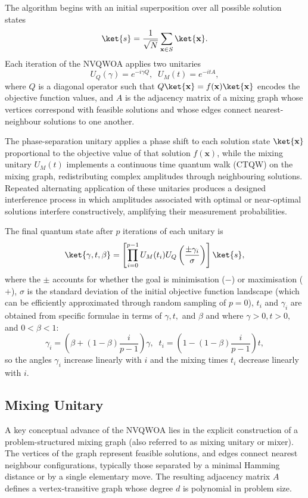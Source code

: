 The algorithm begins with an initial superposition over all possible solution states
$$
\ket{s}=\frac{1}{\sqrt{N}}\sum_{\mathbf{x}\in S}\ket{\mathbf{x}}.
$$
Each iteration of the NVQWOA applies two unitaries
$$
U_Q(\gamma)=e^{-i\gamma Q},\;\;U_M(t)=e^{-itA},
$$
where $Q$ is a diagonal operator such that $Q\ket{\mathbf{x}}=f(\mathbf{x})\ket{\mathbf{x}}$ encodes the objective function values, and $A$ is the adjacency matrix of a mixing graph whose vertices correspond with feasible solutions and whose edges connect nearest-neighbour solutions to one another.

The phase-separation unitary applies a phase shift to each solution state $\ket{\mathbf{x}}$ proportional to the objective value of that solution $f(\mathbf{x})$, while the mixing unitary $U_M(t)$ implements a continuous time quantum walk (CTQW) on the mixing graph, redistributing complex amplitudes through neighbouring solutions. Repeated alternating application of these unitaries produces a designed interference process in which amplitudes associated with optimal or near-optimal solutions interfere constructively, amplifying their measurement probabilities.

The final quantum state after $p$ iterations of each unitary is
$$
\ket{\gamma,t,\beta}=\left[\prod_{i=0}^{p-1} U_M(t_i)U_Q\left(\frac{\pm \gamma_i}{\sigma}\right)\right] \ket{s},
$$
where the $\pm$ accounts for whether the goal is minimisation ($-$) or maximisation ($+$), $\sigma$ is the standard deviation of the initial objective function landscape (which can be efficiently approximated through random sampling of $p=0$), $t_i$ and $\gamma_i$ are obtained from specific formulae in terms of $\gamma, t,$ and $\beta$ and where $\gamma>0, t>0,$ and $0<\beta<1$:
$$
\gamma_i=\left(\beta + (1-\beta)\frac{i}{p-1} \right)\gamma,\;\;t_i=\left(1- (1-\beta)\frac{i}{p-1} \right)t,
$$
so the angles $\gamma_i$ increase linearly with $i$ and the mixing times $t_i$ decrease linearly with $i$.

\subsection{Mixing Unitary}
A key conceptual advance of the NVQWOA lies in the explicit construction of a problem-structured mixing graph (also referred to as mixing unitary or mixer). The vertices of the graph represent feasible solutions, and edges connect nearest neighbour configurations, typically those separated by a minimal Hamming distance or by a single elementary move. The resulting adjacency matrix $A$ defines a vertex-transitive graph whose degree $d$ is polynomial in problem size.

